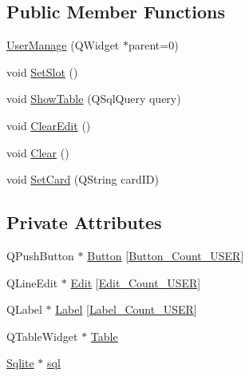 \subsection*{Public Member Functions}
\begin{DoxyCompactItemize}
\item 
\mbox{\hyperlink{class_user_manage_ae341d2b1a3a87f0603a2788f37517c4a}{User\+Manage}} (Q\+Widget $\ast$parent=0)
\item 
void \mbox{\hyperlink{class_user_manage_aa838d49f063bc0a081a1eb4d967c2da3}{Set\+Slot}} ()
\item 
void \mbox{\hyperlink{class_user_manage_aa0a2437c0e95fb846c0e5a237d848af2}{Show\+Table}} (Q\+Sql\+Query query)
\item 
void \mbox{\hyperlink{class_user_manage_afe9919891a0c86cb075ddb9bc12b2be6}{Clear\+Edit}} ()
\item 
void \mbox{\hyperlink{class_user_manage_af3849a855fdde995372d3162fb358472}{Clear}} ()
\item 
void \mbox{\hyperlink{class_user_manage_ab4b39d4a967fc173c0a5ae5d3e2f2ef8}{Set\+Card}} (Q\+String card\+ID)
\end{DoxyCompactItemize}
\subsection*{Private Attributes}
\begin{DoxyCompactItemize}
\item 
Q\+Push\+Button $\ast$ \mbox{\hyperlink{class_user_manage_a625f34397b886a9c18dd7aebd407d2be}{Button}} \mbox{[}\mbox{\hyperlink{usermanage_8h_abdbae7de651447e47cae67dd821a74fb}{Button\+\_\+\+Count\+\_\+\+U\+S\+ER}}\mbox{]}
\item 
Q\+Line\+Edit $\ast$ \mbox{\hyperlink{class_user_manage_aeaa85bb35113ad746d23b0b43b1043bc}{Edit}} \mbox{[}\mbox{\hyperlink{usermanage_8h_ad566d7b39279371cb1144d506523f783}{Edit\+\_\+\+Count\+\_\+\+U\+S\+ER}}\mbox{]}
\item 
Q\+Label $\ast$ \mbox{\hyperlink{class_user_manage_a4a35260a19fd01d67f4d5e8f76aa1865}{Label}} \mbox{[}\mbox{\hyperlink{usermanage_8h_abc2d44d68135265538a4352d526067e8}{Label\+\_\+\+Count\+\_\+\+U\+S\+ER}}\mbox{]}
\item 
Q\+Table\+Widget $\ast$ \mbox{\hyperlink{class_user_manage_a11482daf138a82958adac62c8f5fc1fe}{Table}}
\item 
\mbox{\hyperlink{class_sqlite}{Sqlite}} $\ast$ \mbox{\hyperlink{class_user_manage_ac57f61d7f531b5a48253482ba9493199}{sql}}
\end{DoxyCompactItemize}


